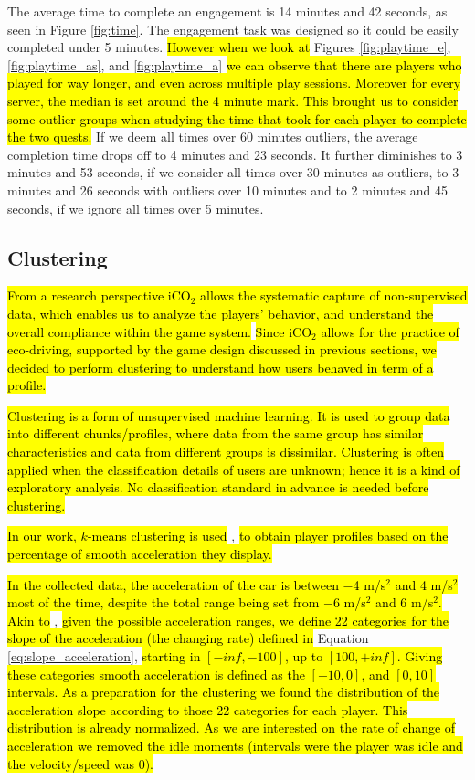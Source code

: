 \documentclass[preprint,authoryear,12pt]{elsarticle}
\newcommand{\hlc}[2][yellow]{ {\sethlcolor{#1} \hl{#2}} }
\begin{document}
The average time to complete an engagement is 14 minutes and 42 seconds, as seen in Figure \ref{fig:time}. 
The engagement task was designed so it could be easily completed under 5 minutes. 
\hlc[green]{However when we look at} Figures \ref{fig:playtime_e}, \ref{fig:playtime_as}, and \ref{fig:playtime_a}
\hlc[green]{we can observe that there are players who played for way longer, and even across multiple play sessions. Moreover for every server, the median is set around the 4 minute mark. This brought us to consider some outlier groups when studying the time that took for each player to complete the two quests.}
If we deem all times over 60 minutes outliers, the average completion time drops off to 4 minutes and 23 seconds. It further diminishes to 3 minutes and 53 seconds, if we consider all times over 30 minutes as outliers, to 3 minutes and 26 seconds with outliers over 10 minutes and to 2 minutes and 45 seconds, if we ignore all times over 5 minutes.

\subsection{Clustering}
\label{subsec:clustering}

\hlc[green]{
From a research perspective iCO$_2$ allows the systematic capture of non-supervised data, which enables us to analyze the players' behavior, and understand the overall compliance within the game system.
}
\hlc[green]{
Since iCO$_2$ allows for the practice of eco-driving, supported by the game design discussed in previous sections, we decided to perform clustering to understand how users behaved in term of a profile.
}

\hlc[green]{
Clustering is a form of unsupervised machine learning. It is used to group data into different chunks/profiles, where data from the same group has similar characteristics and data from different groups is dissimilar. Clustering is often applied when the classification details of users are unknown; hence it is a kind of exploratory analysis. No classification standard in advance is needed before clustering.
}

\hlc[green]
{In our work, $k$-means clustering is used} \citep{KMEAN.1979}, 
\hlc[green]{
to obtain player profiles based on the percentage of smooth acceleration they display.
}

\hlc[green]{
In the collected data, the acceleration of the car is between $-$4 m/s$^2$ and 4 m/s$^2$ most of the time, despite the total range being set from $-$6 m/s$^2$ and 6 m/s$^2$.
Akin to
} \cite{prendingeroliveira2014}, 
\hlc[green]{
given the possible acceleration ranges, we define 22 categories for the slope of the acceleration (the changing rate) defined in 
}
Equation \ref{eq:slope_acceleration}, 
\hlc[green]{
starting in $[-inf , -100]$, up to $[100, +inf]$. Giving these categories smooth acceleration is defined as the $[-10, 0]$, and $[0, 10]$ intervals. 
As a preparation for the clustering we found the distribution of the acceleration slope according to those 22 categories for each player. This distribution is already normalized. 
As we are interested on the rate of change of acceleration we removed the idle moments (intervals were the player was idle and the velocity/speed was 0).
}
\end{document}
